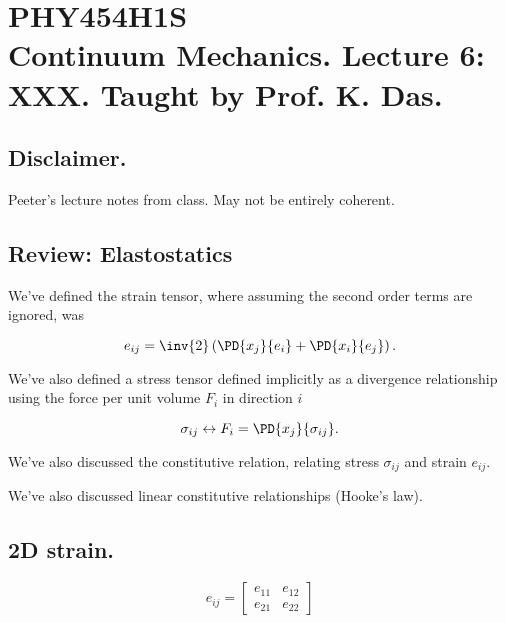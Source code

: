 
%

\chapter{PHY454H1S\\Continuum Mechanics.  Lecture 6: XXX.  Taught by Prof. K. Das.}
\label{chap:continuumL6}
{}
\date{Jan 27, 2012}

\beginArtWithToc

\section{Disclaimer.}

Peeter's lecture notes from class.  May not be entirely coherent.

\section{Review: Elastostatics}

We've defined the strain tensor, where assuming the second order terms are ignored, was

\begin{equation}\label{eqn:continuumL6:10}
e_{ij} = 
\inv{2} \left( 
\PD{x_j}{e_i}
+ \PD{x_i}{e_j} \right).
\end{equation}

We've also defined a stress tensor defined implicitly as a divergence relationship using the force per unit volume $F_i$ in direction $i$

\begin{equation}\label{eqn:continuumL6:30}
\sigma_{ij} \leftrightarrow F_i = \PD{x_j}{\sigma_{ij}}.
\end{equation}

We've also discussed the constitutive relation, relating stress $\sigma_{ij}$ and strain $e_{ij}$.

We've also discussed linear constitutive relationships (Hooke's law).  

\section{2D strain.}

\begin{equation}\label{eqn:continuumL6:50}
e_{ij} = 
\begin{bmatrix}
e_{11} & e_{12} \\
e_{21} & e_{22}
\end{bmatrix}
\end{equation}

